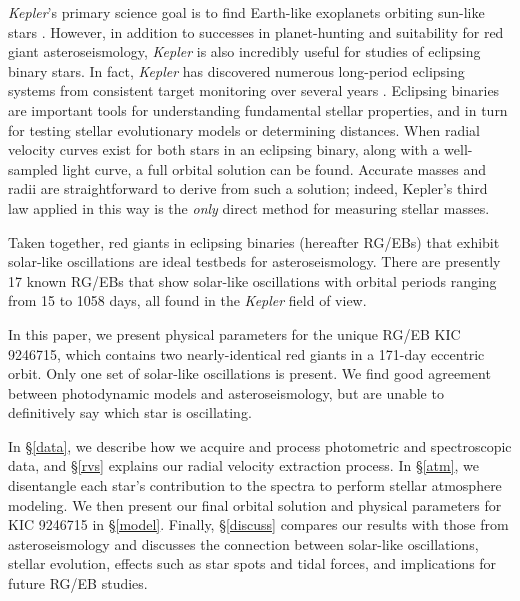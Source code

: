 \emph{Kepler}'s primary science goal is to find Earth-like exoplanets orbiting sun-like stars \citep{bor10}. However, in addition to successes in planet-hunting and suitability for red giant asteroseismology, \emph{Kepler} is also incredibly useful for studies of eclipsing binary stars. In fact, \emph{Kepler} has discovered numerous long-period eclipsing systems from consistent target monitoring over several years \citep{prs11,sla11}. Eclipsing binaries are important tools for understanding fundamental stellar properties, and in turn for testing stellar evolutionary models or determining distances. When radial velocity curves exist for both stars in an eclipsing binary, along with a well-sampled light curve, a full orbital solution can be found. Accurate masses and radii are straightforward to derive from such a solution; indeed, Kepler's third law applied in this way is the \emph{only} direct method for measuring stellar masses.

Taken together, red giants in eclipsing binaries (hereafter RG/EBs) that exhibit solar-like oscillations are ideal testbeds for asteroseismology. There are presently 17 known RG/EBs that show solar-like oscillations \citep{hek10,gau13,gau14,bec14} with orbital periods ranging from 15 to 1058 days, all found in the \emph{Kepler} field of view.

In this paper, we present physical parameters for the unique RG/EB KIC 9246715, which contains two nearly-identical red giants in a 171-day eccentric orbit. Only one set of solar-like oscillations is present. We find good agreement between photodynamic models and asteroseismology, but are unable to definitively say which star is oscillating. %

In \S \ref{data}, we describe how we acquire and process photometric and spectroscopic data, and \S \ref{rvs} explains our radial velocity extraction process. In \S \ref{atm}, we disentangle each star's contribution to the spectra to perform stellar atmosphere modeling. We then present our final orbital solution and physical parameters for KIC 9246715 in \S \ref{model}. Finally, \S \ref{discuss} compares our results with those from asteroseismology and discusses the connection between solar-like oscillations, stellar evolution, effects such as star spots and tidal forces, and implications for future RG/EB studies.
  